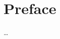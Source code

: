 \chapter*{Preface}                                  \label{ch:preface}

\ldots

\instructionspreface


\cleardoublepage

